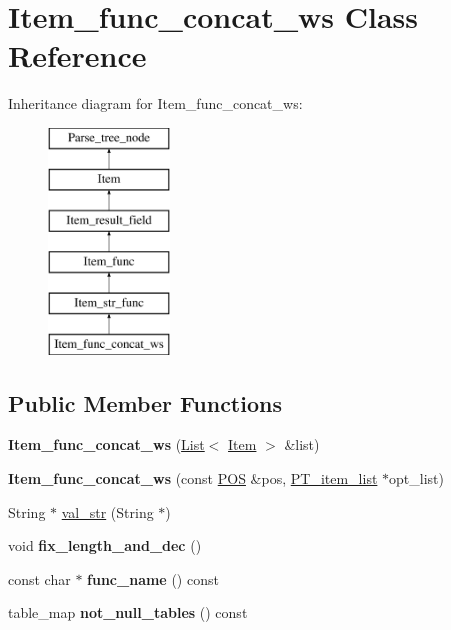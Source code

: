 \hypertarget{classItem__func__concat__ws}{}\section{Item\+\_\+func\+\_\+concat\+\_\+ws Class Reference}
\label{classItem__func__concat__ws}
Inheritance diagram for Item\+\_\+func\+\_\+concat\+\_\+ws\+:\begin{figure}[H]
\begin{center}
\leavevmode
\includegraphics[height=6.000000cm]{classItem__func__concat__ws}
\end{center}
\end{figure}
\subsection*{Public Member Functions}
\begin{DoxyCompactItemize}
\item 
\mbox{\label{classItem__func__concat__ws_adc1a1b29fc3e202462c38f52f8f9e143}} 
{\bfseries Item\+\_\+func\+\_\+concat\+\_\+ws} (\mbox{\hyperlink{classList}{List}}$<$ \mbox{\hyperlink{classItem}{Item}} $>$ \&list)
\item 
\mbox{\label{classItem__func__concat__ws_a410ff61b4c7b1d14d6597d98f1308cf0}} 
{\bfseries Item\+\_\+func\+\_\+concat\+\_\+ws} (const \mbox{\hyperlink{structYYLTYPE}{P\+OS}} \&pos, \mbox{\hyperlink{classPT__item__list}{P\+T\+\_\+item\+\_\+list}} $\ast$opt\+\_\+list)
\item 
String $\ast$ \mbox{\hyperlink{classItem__func__concat__ws_a2ed0538e7772c8ace7b1cf049b200111}{val\+\_\+str}} (String $\ast$)
\item 
\mbox{\label{classItem__func__concat__ws_a6c82a28e83e556dcb4c8317e54b89b4a}} 
void {\bfseries fix\+\_\+length\+\_\+and\+\_\+dec} ()
\item 
\mbox{\label{classItem__func__concat__ws_a54b2180895b93577975c2f20ee02f1a2}} 
const char $\ast$ {\bfseries func\+\_\+name} () const
\item 
\mbox{\label{classItem__func__concat__ws_a130fe37d530c125b63442c3bd112dc49}} 
table\+\_\+map {\bfseries not\+\_\+null\+\_\+tables} () const
\end{DoxyCompactItemize}
